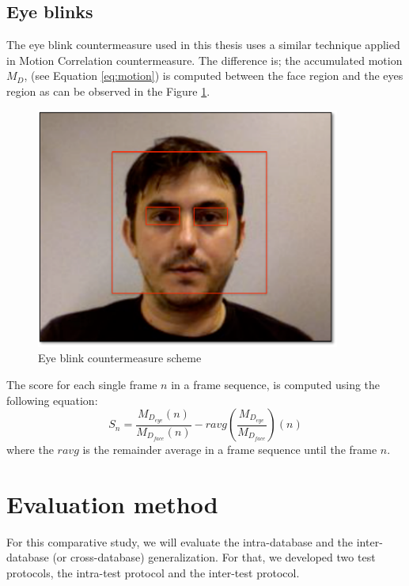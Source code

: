 \subsection{Eye blinks}

The eye blink countermeasure used in this thesis uses a similar technique applied in Motion Correlation countermeasure\cite{AnjosIJCB2011}. The difference is; the accumulated motion $M_D$, (see Equation \ref{eq:motion}) is computed between the face region and the eyes region as can be observed in the Figure \ref{fig:eye_blink}. 

\begin{figure}[!btb]
\begin{center}
\includegraphics [width=10cm] {images/eye_blink.pdf}
\caption[Eye blink countermeasure scheme]{Eye blink countermeasure scheme}
\label{fig:eye_blink}
\end{center}
\end{figure}


The score for each single frame $n$ in a frame sequence, is computed using the following equation:
\begin{equation}
S_n=   \frac{M_{D_{eye}}(n)}{M_{D_{face}}(n)} - ravg(\frac{M_{D_{eye}}}{M_{D_{face}}})(n)
\label{eq:score_blink}
\end{equation}
where the $ravg$ is the remainder average in a frame sequence until the frame $n$.


\section{Evaluation method}
\label{sec:Evaluation_Protocol}

For this comparative study, we will evaluate the intra-database and the inter-database (or cross-database) generalization. For that, we developed two test protocols, the intra-test protocol and the inter-test protocol. 

